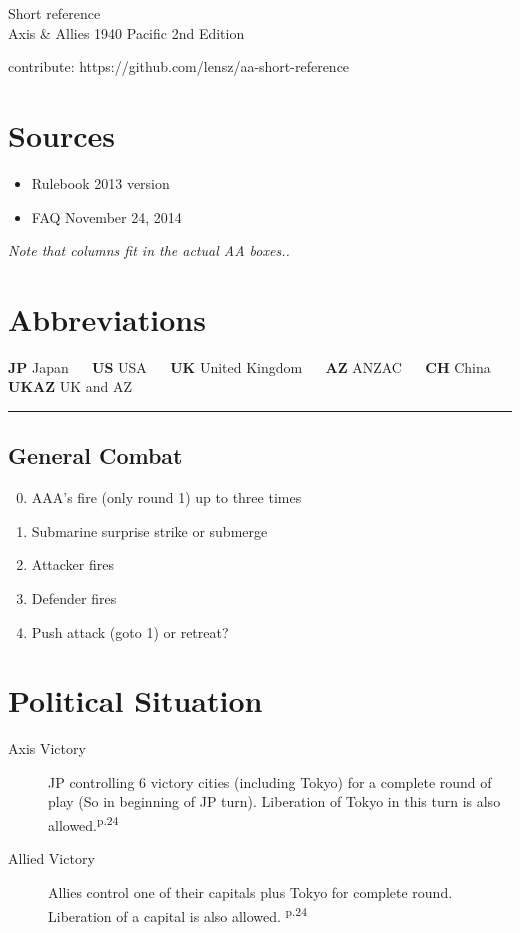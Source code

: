 \documentclass[10pt,a4paper,landscape]{article}
\begin{document}
\begin{multicols*}{3}
\begin{center}
{\Large Short reference}\\
\vspace{.2cm}
{\large Axis \& Allies 1940 Pacific 2nd Edition}

\vspace{.5cm}
contribute: https://github.com/lensz/aa-short-reference
\end{center}

\section*{{\normalsize Sources}}
\begin{itemize}
\item Rulebook 2013 version
\item FAQ November 24, 2014
\end{itemize}

\noindent\textsl{Note that columns fit in the actual AA boxes..}

\section*{{\normalsize Abbreviations}}
\textbf{JP} Japan ~~ \textbf{US} USA ~~ \textbf{UK} United Kingdom ~~ \textbf{AZ} ANZAC ~~ \textbf{CH} China ~~ \textbf{UKAZ} UK and AZ



\noindent\rule{7.5cm}{0.4pt}

\subsection*{General Combat}
\begin{enumerate}
\setcounter{enumi}{-1}
\item AAA's fire (only round 1) up to three times
\item Submarine surprise strike or submerge
\item Attacker fires
\item Defender fires
\item Push attack (goto 1) or retreat?
\end{enumerate}

\section*{Political Situation}
\begin{description}
\item[Axis Victory] JP controlling 6 victory cities (including Tokyo) for a complete round of play (So in beginning of JP turn). Liberation of Tokyo in this turn is also allowed.\textsuperscript{p.24}
\item[Allied Victory] Allies control one of their capitals plus Tokyo for complete round. Liberation  of a capital is also allowed. \textsuperscript{p.24}
\end{description}


\end{multicols*}
\end{document}
